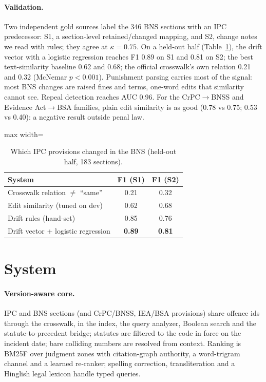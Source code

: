 \documentclass[11pt]{article}
\begin{document}
\paragraph{Validation.} Two independent gold sources label the 346 BNS sections with an IPC
predecessor: S1, a section-level retained/changed mapping, and S2, change notes we read with rules;
they agree at $\kappa=0.75$. On a held-out half (Table~\ref{tab:drift}), the drift vector with a
logistic regression reaches F1 0.89 on S1 and 0.81 on S2; the best text-similarity baseline 0.62
and 0.68; the official crosswalk's own relation 0.21 and 0.32 (McNemar $p<0.001$). Punishment
parsing carries most of the signal: most BNS changes are raised fines and terms, one-word edits that
similarity cannot see. Repeal detection reaches AUC 0.96. For the CrPC$\rightarrow$BNSS and
Evidence Act$\rightarrow$BSA families, plain edit similarity is as good (0.78 vs 0.75; 0.53 vs
0.40): a negative result outside penal law.

\begin{table}[t]
\centering\small
\begin{adjustbox}{max width=\linewidth}
\begin{tabular}{lcc}
\toprule
System & F1 (S1) & F1 (S2) \\
\midrule
Crosswalk relation $\neq$ ``same'' & 0.21 & 0.32 \\
Edit similarity (tuned on dev) & 0.62 & 0.68 \\
Drift rules (hand-set) & 0.85 & 0.76 \\
Drift vector + logistic regression & \textbf{0.89} & \textbf{0.81} \\
\bottomrule
\end{tabular}
\end{adjustbox}
\caption{Which IPC provisions changed in the BNS (held-out half, 183 sections).}
\label{tab:drift}
\end{table}

\section{System}\label{sec:system}
\paragraph{Version-aware core.} IPC and BNS sections (and CrPC/BNSS, IEA/BSA provisions) share
offence ids through the crosswalk, in the index, the query analyzer, Boolean search and the
statute-to-precedent bridge; statutes are filtered to the code in force on the incident date;
bare colliding numbers are resolved from context. Ranking is BM25F over judgment zones with
citation-graph authority, a word-trigram channel and a learned re-ranker; spelling correction,
transliteration and a Hinglish legal lexicon handle typed queries.
\end{document}
